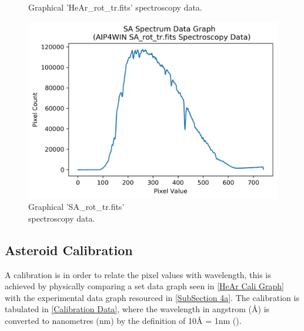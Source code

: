 \documentclass[12pt]{article}
\begin{document}
\begin{multicols}{3}
\begin{figure}[H]
  \caption{\label{HeAr Python Graph} Graphical 'HeAr\_rot\_tr.fits' spectroscopy data.}
\end{figure}
\begin{figure}[H]
  \centering
  \ContinuedFloat
  \includegraphics[scale=0.4]{Images/AsImages/S4/SA/SAPythonGraph.png}
  \caption{\label{SA Python Graph} Graphical 'SA\_rot\_tr.fits' \\spectroscopy data.}
\end{figure}
\end{multicols}

\subsection{Asteroid Calibration}
\label{SubSection 4b}

A calibration is in order to relate the pixel values with wavelength, this is achieved by physically comparing a set data graph seen in \cref{HeAr Cali Graph} with the experimental data graph resourced in \cref{SubSection 4a}. The calibration is tabulated in \cref{Calibration Data}, where the wavelength in angstrom (\si{\angstrom}) is converted to nanometres (nm) by the definition of 10\si{\angstrom} = 1nm (\cite{ImageProcessing}).
\end{document}
